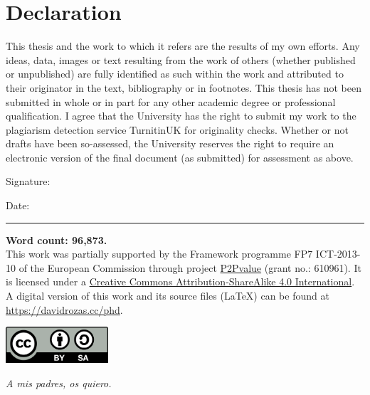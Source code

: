 \section*{Declaration}

This thesis and the work to which it refers are the results of my own efforts. Any ideas, data, images or
text resulting from the work of others (whether published or unpublished) are fully identified as such
within the work and attributed to their originator in the text, bibliography or in footnotes. This thesis
has not been submitted in whole or in part for any other academic degree or professional qualification.
I agree that the University has the right to submit my work to the plagiarism detection service
TurnitinUK for originality checks. Whether or not drafts have been so-assessed, the University reserves
the right to require an electronic version of the final document (as submitted) for assessment as above.

\vspace{.6in}
Signature:


\vspace{.6in}


Date:


\vspace{4.5cm}

\par\noindent\rule{\textwidth}{0.4pt}

\hspace{2.9cm}
\begin{minipage}[b]{0.75\linewidth}
\begin{flushright}
{\small 

\textbf{Word count: 96,873.}\\

This work was partially supported by the Framework programme FP7 ICT-2013-10 of the European Commission through project \href{http://www.p2pvalue.eu/}{P2Pvalue} (grant no.: 610961).
It is licensed under a \href{https://creativecommons.org/licenses/by-sa/4.0/}{Creative Commons Attribution-ShareAlike 4.0 International}.\\
A digital version of this work and its source files (\LaTeX) can be found at \url{https://davidrozas.cc/phd}. 
}

\vspace{0.5cm}

\includegraphics[width=1.5in]{img/CC-BY-SA_icon.png} 

\end{flushright}
\end{minipage}

\newpage
\begin{flushright}
\vspace*{2cm}
\large{\textit{A mis padres, os quiero.}}
\end{flushright}